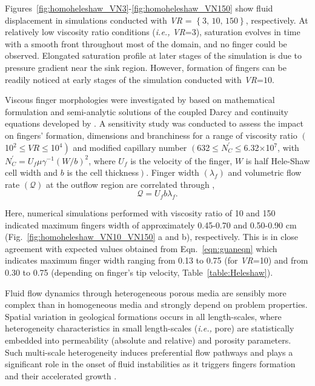 \documentclass[preprint,authoryear,12pt]{elsarticle}
\newcommand{\ie}{{\it i.e., }}
\begin{document}
\medskip
Figures~\ref{fig:homoheleshaw_VN3}-\ref{fig:homoheleshaw_VN150} show fluid displacement in simulations conducted with {\it VR} = $\left\{\text{3, 10, 150}\right\}$, respectively. At relatively low viscosity ratio conditions (\ie {\it VR}=3), saturation evolves in time with a smooth front throughout most of the domain, and no finger could be observed. Elongated saturation profile at later stages of the simulation is due to pressure gradient near the sink region. However, formation of fingers can be readily noticed at early stages of the simulation conducted with {\it VR}=$10$. 

\medskip
Viscous finger morphologies were investigated by \citet{guan_2003} based on mathematical formulation and semi-analytic solutions of the coupled Darcy and continuity equations developed by \citet{mclean_1981}. A sensitivity study was conducted to assess the impact on fingers' formation, dimensions and branchiness for a range of viscosity ratio $\left(\right.$10$^{2}\le\textit{VR}\le$10$\left.^{4}\right)$ and modified capillary number $\left(\right.$632$\le N_{C}^{'}\le$6.32$\times$10$^{7}$, with $N_{C}^{'}= U_{f}\mu\gamma^{-1}(W/b)^{2}$, where $U_{f}$ is the velocity of the finger, $W$ is half Hele-Shaw cell width and $b$ is the cell thickness$\left.\right)$. Finger width $\left(\lambda_{f}\right)$ and volumetric flow rate $\left(\mathcal{Q}\right)$ at the outflow region are correlated through \citep{guan_2003},    
\begin{equation}   
   \mathcal{Q} = U_{f} b \lambda_{f}.\label{eqn:guaneqn} 
\end{equation}  

\noindent Here, numerical simulations performed with viscosity ratio of 10 and 150 indicated maximum fingers width of approximately 0.45-0.70 and 0.50-0.90 cm (Fig.~\ref{fig:homoheleshaw_VN10_VN150} a and b), respectively. This is in close agreement with expected values obtained from Eqn.~\ref{eqn:guaneqn} which indicates maximum finger width ranging from 0.13 to 0.75 (for {\it VR}=10) and from 0.30 to 0.75 (depending on finger's tip velocity, Table~\ref{table:Heleshaw}). 
  
\medskip
Fluid flow dynamics through heterogeneous porous media are sensibly more complex than in homogeneous media and strongly depend on problem properties. Spatial variation in geological formations occurs in all length-scales, where heterogeneity characteristics in small length-scales (\ie pore) are statistically embedded into permeability (absolute and relative) and porosity parameters. Such multi-scale heterogeneity induces preferential flow pathways and plays a significant role in the onset of fluid instabilities as it triggers fingers formation and their accelerated growth \citep[see][]{ewing_1989,tchelepi_1994}.
\end{document}
